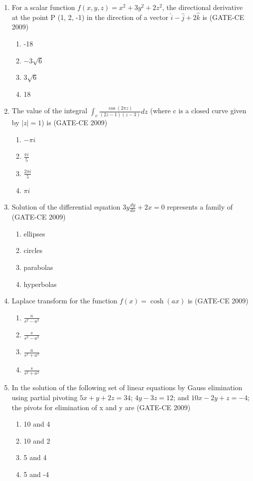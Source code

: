\documentclass[journal,12pt,onecolumn]{article}
\theoremstyle{remark}
\begin{document}
\begin{enumerate}
    \item For a scalar function $f(x, y, z) = x^2 + 3y^2 + 2z^2$, the directional derivative at the point P (1, 2, -1) in the direction of a vector $\hat{i} - \hat{j} + 2\hat{k}$ is (GATE-CE 2009)
    \begin{enumerate}
        \item -18 
        \item $-3\sqrt{6}$ 
        \item $3\sqrt{6}$ 
        \item 18
    \end{enumerate}

    \item The value of the integral $\int_{c} \frac{\cos(2\pi z)}{(2z-1)(z-3)} dz$ (where c is a closed curve given by $|z|=1$) is (GATE-CE 2009)
    \begin{enumerate}
        \item $-\pi i$ 
        \item $\frac{\pi i}{5}$ 
        \item $\frac{2\pi i}{5}$ 
        \item $\pi i$
    \end{enumerate}
    
    \item Solution of the differential equation $3y\frac{dy}{dx}+2x=0$ represents a family of (GATE-CE 2009)
    \begin{enumerate}
        \item ellipses 
        \item circles 
        \item parabolas 
        \item hyperbolas
    \end{enumerate}
    
    \item Laplace transform for the function $f(x)=\cosh(ax)$ is (GATE-CE 2009)
    \begin{enumerate}
        \item $\frac{a}{s^2-a^2}$ 
        \item $\frac{s}{s^2-a^2}$ 
        \item $\frac{a}{s^2+a^2}$ 
        \item $\frac{s}{s^2+a^2}$
    \end{enumerate}
    
    \item In the solution of the following set of linear equations by Gauss elimination using partial pivoting  
    $5x+y+2z=34$;  $4y-3z=12$; and  $10x-2y+z=-4$; 
    the pivots for elimination of x and y are (GATE-CE 2009)
    \begin{enumerate}
        \item 10 and 4 
        \item 10 and 2 
        \item 5 and 4 
        \item 5 and -4
    \end{enumerate}
    

\end{enumerate}
\end{document}
